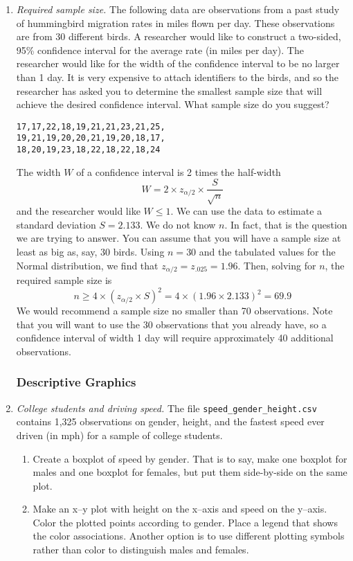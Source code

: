 \begin{enumerate}
\item \emph{Required sample size.} The following data are observations
  from a past study of hummingbird migration rates in miles flown per
  day. These observations are from 30 different birds. A researcher
  would like to construct a two-sided, 95\% confidence interval for
  the average rate (in miles per day). The researcher would like for
  the width of the confidence interval to be no larger than 1 day. It
  is very expensive to attach identifiers to the birds, and so the
  researcher has asked you to determine the smallest sample size that
  will achieve the desired confidence interval. What sample size do
  you suggest?
\begin{Verbatim}[samepage=true]
17,17,22,18,19,21,21,23,21,25,
19,21,19,20,20,21,19,20,18,17,
18,20,19,23,18,22,18,22,18,24
\end{Verbatim}

\begin{solution}
\bs The width $W$ of a confidence interval is
2 times the half-width
\[
W = 2 \times z_{\alpha/2} \times \frac{S}{\sqrt{n}}
\]
and the researcher would like $W\leq 1$. We can use the data to
estimate a standard deviation $S = 2.133$. We do not know $n$. In
fact, that is the question we are trying to answer. You can assume
that you will have a sample size at least as big as, say, 30
birds. Using $n=30$ and the tabulated values for the Normal
distribution, we find that $z_{\alpha/2} = z_{.025} = 1.96$.  Then,
solving for $n$, the required sample size is
\[
n \geq 4 \times (z_{\alpha/2} \times S)^2 = 
4 \times (1.96 \times 2.133)^2 = 69.9
\]
We would recommend a sample size no smaller than 70 observations.
Note that you will want to use the 30 observations that you already
have, so a confidence interval of width 1 day will require 
approximately 40 additional observations.
\end{solution}

\subsubsection*{Descriptive Graphics}

\item \emph{College students and driving speed.} The file
  \texttt{speed\_gender\_height.csv} contains 1,325 observations on
  gender, height, and the fastest speed ever driven (in mph) for a
  sample of college students.

\begin{enumerate}
\item Create a boxplot of speed by gender. That is to say, make one
  boxplot for males and one boxplot for females, but put them
  side-by-side on the same plot.
\item Make an x--y plot with height on the x--axis and speed on the
  y--axis. Color the plotted points according to gender. Place a
  legend that shows the color associations. Another option is to use
  different plotting symbols rather than color to distinguish males
  and females.
\end{enumerate}

\end{enumerate}
